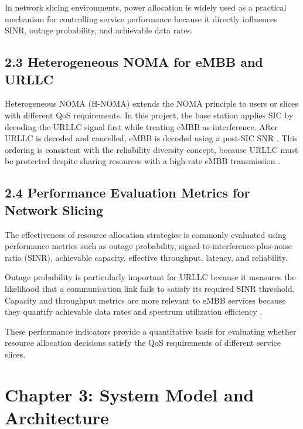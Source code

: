 \documentclass[
]{article}
\begin{document}
In network slicing environments, power allocation is widely used as a
practical mechanism for controlling service performance because it
directly influences SINR, outage probability, and achievable data rates.

\subsection{2.3 Heterogeneous NOMA for eMBB and
URLLC}\label{heterogeneous-noma-for-embb-and-urllc}

Heterogeneous NOMA (H-NOMA) extends the NOMA principle to users or
slices with different QoS requirements. In this project, the base
station applies SIC by decoding the URLLC signal first while treating
eMBB as interference. After URLLC is decoded and cancelled, eMBB is
decoded using a post-SIC SNR \parencite{Popovski2018}. This ordering is consistent with the
reliability diversity concept, because URLLC must be protected despite
sharing resources with a high-rate eMBB transmission .


\subsection{2.4 Performance Evaluation Metrics for Network
Slicing}\label{performance-evaluation-metrics-for-network-slicing}

The effectiveness of resource allocation strategies is commonly
evaluated using performance metrics such as outage probability,
signal-to-interference-plus-noise ratio (SINR), achievable capacity,
effective throughput, latency, and reliability.

Outage probability is particularly important for URLLC because it
measures the likelihood that a communication link fails to satisfy its
required SINR threshold. Capacity and throughput metrics are more
relevant to eMBB services because they quantify achievable data rates
and spectrum utilization efficiency \parencite{Men2017}.

These performance indicators provide a quantitative basis for evaluating
whether resource allocation decisions satisfy the QoS requirements of
different service slices.

\clearpage

\section{Chapter 3: System Model and
Architecture}\label{chapter-3-system-model-and-architecture}
\end{document}
